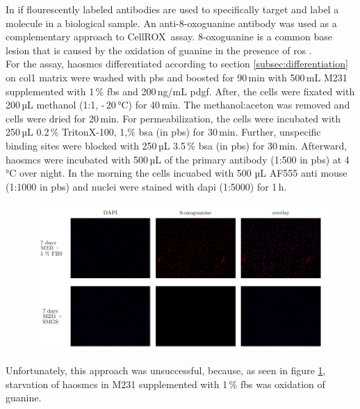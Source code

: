 In \ac{if} flourescently labeled antibodies are used to specifically target and label a molecule in a biological sample. An anti-8-oxoguanine antibody was used as a complementary approach to CellROX\texttrademark~assay. 8-oxoguanine is a common base lesion that is caused by the oxidation of guanine in the presence of \ac{ros} \cite{leon8OxoguanineAccumulationMitochondrial2016}.\\
For the assay, \acp{haosmc} differentiated according to section \ref{subsec:differentiation} on \ac{col1} matrix were washed with \ac{pbs} and boosted for 90\,min with 500\,mL \ac{M231} supplemented with 1\,\% \ac{fbs} and 200\,ng/mL \ac{pdgf}. After, the cells were fixated with 200\,µL methanol (1:1, -\,20\,°C) for 40\,min. The methanol:aceton was removed and cells were dried for 20\,min. For permeabilization, the cells were incubated with 250\,µL 0.2\,\% Triton\textregistered X-100, 1,\% \ac{bsa} (in \ac{pbs}) for 30\,min. Further, unspecific binding sites were blocked with 250\,µL 3.5\,\% \ac{bsa} (in \ac{pbs}) for 30\,min. Afterward, \acp{haosmc} were incubated with 500\,µL of the primary antibody (1:500 in \ac{pbs}) at 4\,°C over night. In the morning the cells incuabed with 500 µL AF555 anti mouse (1:1000 in \ac{pbs}) and nuclei were stained with \acf{dapi} (1:5000) for 1\,h.

\setcounter{figure}{1}
\begin{figure}[H]
    \capstart
    \centering
    \includegraphics{Abbildung/8oxoG.pdf}

    \begin{minipage}{\captionwidth}
        \caption[antibody]{\newline
        }
        \label{fig:antibody}
    \end{minipage}
\end{figure}

Unfortunately, this approach was unsuccessful, because, as seen in figure \ref{fig:antibody}, starvation of \acp{haosmc} in \ac{M231} supplemented with 1\,\% \ac{fbs} was oxidation of guanine.

